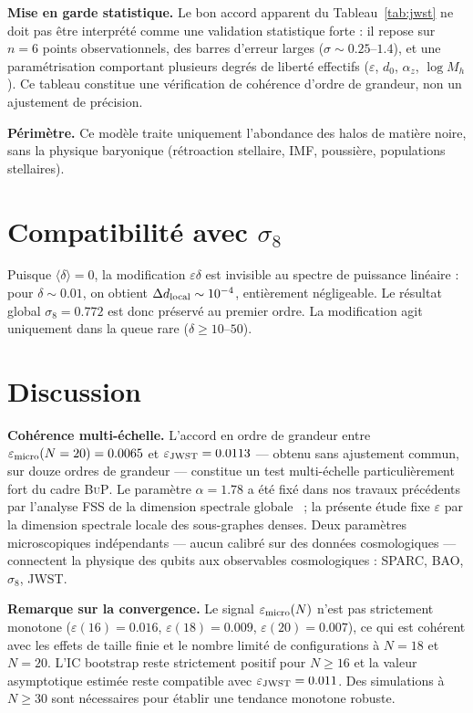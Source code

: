 \documentclass[11pt]{article}
\newcommand{\sig}{\sigma_8}
\newcommand{\BuP}{\textsc{BuP}}
\begin{document}
\noindent\textbf{Mise en garde statistique.}
Le bon accord apparent du Tableau~\ref{tab:jwst} ne doit pas être interprété comme une validation statistique forte : il repose sur $n=6$ points observationnels, des barres d'erreur larges ($\sigma \sim 0.25$--$1.4$), et une paramétrisation comportant plusieurs degrés de liberté effectifs ($\varepsilon$, $d_0$, $\alpha_z$, $\log M_h$).
Ce tableau constitue une vérification de cohérence d'ordre de grandeur, non un ajustement de précision.

\noindent\textbf{Périmètre.}
Ce modèle traite uniquement l'abondance des halos de matière noire, sans la physique baryonique (rétroaction stellaire, IMF, poussière, populations stellaires).

\section{Compatibilité avec $\sigma_8$}

Puisque $\langle\delta\rangle = 0$, la modification $\varepsilon\delta$ est invisible au spectre de puissance linéaire : pour $\delta \sim 0.01$, on obtient $\Delta d_{\rm local} \sim 10^{-4}$, entièrement négligeable.
Le résultat global $\sig = 0.772$ est donc préservé au premier ordre.
La modification agit uniquement dans la queue rare ($\delta \ge 10$--$50$).

\section{Discussion}

\noindent\textbf{Cohérence multi-échelle.}
L'accord en ordre de grandeur entre $\varepsilon_{\rm micro}(N=20) = 0.0065$
et $\varepsilon_{\rm JWST} = 0.0113$ --- obtenu sans ajustement commun,
sur douze ordres de grandeur --- constitue un test multi-échelle
particulièrement fort du cadre \BuP.
Le paramètre $\alpha = 1.78$ a été fixé dans nos travaux précédents
par l'analyse FSS de la dimension spectrale globale~\cite{hamdad2026bup} ;
la présente étude fixe $\varepsilon$ par la dimension spectrale locale
des sous-graphes denses.
Deux paramètres microscopiques indépendants --- aucun calibré sur des
données cosmologiques --- connectent la physique des qubits aux
observables cosmologiques : SPARC, BAO, $\sig$, JWST.

\noindent\textbf{Remarque sur la convergence.}
Le signal $\varepsilon_{\rm micro}(N)$ n'est pas strictement monotone
($\varepsilon(16)=0.016$, $\varepsilon(18)=0.009$, $\varepsilon(20)=0.007$),
ce qui est cohérent avec les effets de taille finie et le nombre limité
de configurations à $N=18$ et $N=20$.
L'IC bootstrap reste strictement positif pour $N\ge 16$ et la valeur
asymptotique estimée reste compatible avec $\varepsilon_{\rm JWST}=0.011$.
Des simulations à $N\ge 30$ sont nécessaires pour établir une tendance
monotone robuste.
\end{document}
